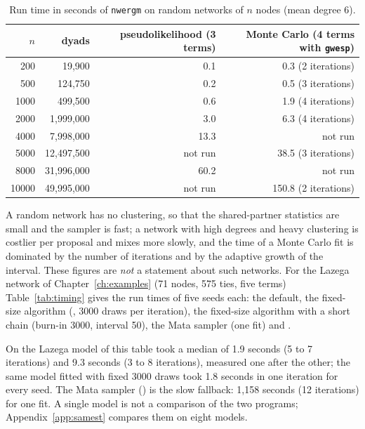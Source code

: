 \begin{table}[ht]\centering\small
\caption{Run time in seconds of \texttt{nwergm} on random networks of $n$ nodes (mean degree 6).}\label{tab:scaling}
\begin{tabular}{@{}rrrr@{}}\toprule
$n$ & dyads & pseudolikelihood (3 terms) & Monte Carlo (4 terms with \texttt{gwesp})\\\midrule
200 & 19,900 & 0.1 & 0.3 (2 iterations)\\
500 & 124,750 & 0.2 & 0.5 (3 iterations)\\
1000 & 499,500 & 0.6 & 1.9 (4 iterations)\\
2000 & 1,999,000 & 3.0 & 6.3 (4 iterations)\\
4000 & 7,998,000 & 13.3 & not run\\
5000 & 12,497,500 & not run & 38.5 (3 iterations)\\
8000 & 31,996,000 & 60.2 & not run\\
10000 & 49,995,000 & not run & 150.8 (2 iterations)\\\bottomrule
\end{tabular}
\end{table}

A random network has no clustering, so that the shared-partner statistics are small and the sampler is fast; a network with high degrees and heavy clustering is costlier per proposal and mixes more slowly, and the time of a Monte Carlo fit is dominated by the number of iterations and by the adaptive growth of the interval. These figures are \emph{not} a statement about such networks. For the Lazega network of Chapter~\ref{ch:examples} (71 nodes, 575 ties, five terms) Table~\ref{tab:timing} gives the run times of five seeds each: the default, the fixed-size algorithm (, 3000 draws per iteration), the fixed-size algorithm with a short chain (burn-in 3000, interval 50), the Mata sampler (one fit) and \ergm{}.

\begin{table}[ht]\centering\small
\caption{Run time in seconds of the Lazega model (five seeds). nwergm with default settings, with fixed-size samples and with fixed-size samples and a short chain (native plugin), the Mata sampler with default settings (one run), and R's \texttt{ergm()} with its defaults, on the machine of Appendix~\ref{app:samest} (9 November 2026, \nwergm{}~1.5.2).}\label{tab:timing}

\end{table}

On the Lazega model of this table \nwergm{} took a median of 1.9 seconds (5 to 7 iterations) and \ergm{} 9.3 seconds (3 to 8 iterations), measured one after the other; the same model fitted with fixed 3000 draws took 1.8 seconds in one iteration for every seed. The Mata sampler () is the slow fallback: 1,158 seconds (12 iterations) for one fit. A single model is not a comparison of the two programs; Appendix~\ref{app:samest} compares them on eight models.

